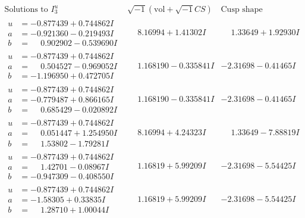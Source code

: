 \documentclass[1p]{elsarticle_modified}
\theoremstyle{definition}
\newcommand{\I}{\sqrt{-1}}
\begin{document}
$$\begin{array}{c|c|c}  
\text{Solutions to }I^u_{3}& \I (\text{vol} + \sqrt{-1}CS) & \text{Cusp shape}\\
 \hline 
\begin{aligned}
u &= -0.877439 + 0.744862 I \\
a &= -0.921360 - 0.219493 I \\
b &= \phantom{-}0.902902 - 0.539690 I\end{aligned}
 & \phantom{-}8.16994 + 1.41302 I & \phantom{-}1.33649 + 1.92930 I \\ \hline\begin{aligned}
u &= -0.877439 + 0.744862 I \\
a &= \phantom{-}0.504527 - 0.969052 I \\
b &= -1.196950 + 0.472705 I\end{aligned}
 & \phantom{-}1.168190 - 0.335841 I & -2.31698 - 0.41465 I \\ \hline\begin{aligned}
u &= -0.877439 + 0.744862 I \\
a &= -0.779487 + 0.866165 I \\
b &= \phantom{-}0.685429 - 0.020892 I\end{aligned}
 & \phantom{-}1.168190 - 0.335841 I & -2.31698 - 0.41465 I \\ \hline\begin{aligned}
u &= -0.877439 + 0.744862 I \\
a &= \phantom{-}0.051447 + 1.254950 I \\
b &= \phantom{-}1.53802 - 1.79281 I\end{aligned}
 & \phantom{-}8.16994 + 4.24323 I & \phantom{-}1.33649 - 7.88819 I \\ \hline\begin{aligned}
u &= -0.877439 + 0.744862 I \\
a &= \phantom{-}1.42701 - 0.08967 I \\
b &= -0.947309 - 0.408550 I\end{aligned}
 & \phantom{-}1.16819 + 5.99209 I & -2.31698 - 5.54425 I \\ \hline\begin{aligned}
u &= -0.877439 + 0.744862 I \\
a &= -1.58305 + 0.33835 I \\
b &= \phantom{-}1.28710 + 1.00044 I\end{aligned}
 & \phantom{-}1.16819 + 5.99209 I & -2.31698 - 5.54425 I \\ \hline\begin{aligned}

\end{aligned}
\end{array}$$
\end{document}
